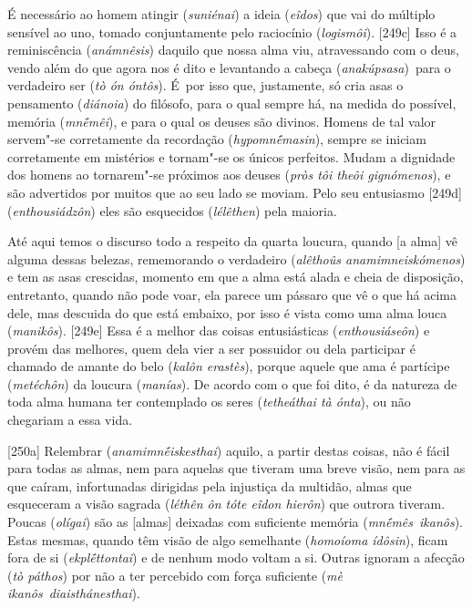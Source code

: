 É necessário ao homem atingir (\emph{suniénai}) a ideia (\emph{eîdos})
que vai do múltiplo sensível ao uno, tomado conjuntamente pelo
raciocínio (\emph{logismôi}). [249c] Isso é a reminiscência
(\emph{anámnêsis}) daquilo que nossa alma viu, atravessando com o deus,
vendo além do que agora nos é dito e levantando a cabeça
(\emph{anakúpsasa})~para o verdadeiro ser (\emph{tò ón óntôs}). É~por
isso que, justamente, só cria asas o pensamento (\emph{diánoia}) do
filósofo, para o qual sempre há, na medida do possível, memória
(\emph{mnḗmêi}), e para o qual os deuses são divinos. Homens de tal
valor servem"-se corretamente da recordação (\emph{hypomnḗmasin}), sempre
se iniciam corretamente em mistérios e tornam"-se os únicos perfeitos.
Mudam a dignidade dos homens ao tornarem"-se próximos aos deuses
(\emph{pròs tôi theôi gignómenos}), e são advertidos por muitos que ao
seu lado se moviam. Pelo seu entusiasmo [249d]
(\emph{enthousiádzôn}) eles são esquecidos (\emph{lélêthen}) pela
maioria.

Até aqui temos o discurso todo a respeito da quarta loucura, quando [a
alma] vê alguma dessas belezas, rememorando o verdadeiro
(\emph{alêthoûs anamimneiskómenos}) e tem as asas crescidas, momento em
que a alma está alada e cheia de disposição, entretanto, quando não pode
voar, ela parece um pássaro que vê o que há acima dele, mas descuida do
que está embaixo, por isso é vista como uma alma louca (\emph{manikôs}).
[249e] Essa é a melhor das coisas entusiásticas
(\emph{enthousiáseôn}) e provém das melhores, quem dela vier a ser
possuidor ou dela participar é chamado de amante do belo (\emph{kalôn
erastès}), porque aquele que ama é partícipe (\emph{metéchôn}) da
loucura (\emph{manías}). De acordo com o que foi dito, é da natureza de
toda alma humana ter contemplado os seres (\emph{tetheáthai tà ónta}),
ou não chegariam a essa vida.

[250a] Relembrar (\emph{anamimnḗiskesthai}) aquilo, a partir destas
coisas, não é fácil para todas as almas, nem para aquelas que tiveram
uma breve visão, nem para as que caíram, infortunadas dirigidas pela
injustiça da multidão, almas que esqueceram a visão sagrada
(\emph{léthên ôn tóte eîdon hierôn}) que outrora tiveram. Poucas
(\emph{olígai}) são as [almas] deixadas com suficiente memória
(\emph{mnḗmês}~\emph{ikanôs}). Estas mesmas, quando têm visão de algo
semelhante (\emph{homoíoma ídôsin}), ficam fora de si
(\emph{ekplḗttontai}) e de nenhum modo voltam a si. Outras ignoram a
afecção (\emph{tò páthos}) por não a ter percebido com força suficiente
(\emph{mè ikanôs}~\emph{diaisthánesthai}).

